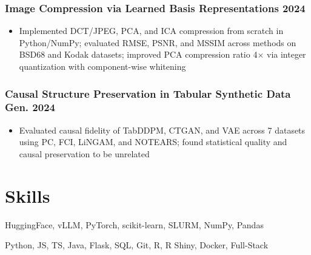 \documentclass[10pt]{article} %
\begin{document}
\subsubsection{Image Compression via Learned Basis Representations \hfill 2024}
\begin{itemize}
	\item Implemented DCT/JPEG, PCA, and ICA compression from scratch in Python/NumPy; evaluated RMSE, PSNR, and MSSIM across methods on BSD68 and Kodak datasets; improved PCA compression ratio 4$\times$ via integer quantization with component-wise whitening
\end{itemize}
\vspace{-7pt}
\subsubsection{Causal Structure Preservation in Tabular Synthetic Data Gen. \hfill 2024}
\begin{itemize}
	\item Evaluated causal fidelity of TabDDPM, CTGAN, and VAE across 7 datasets using PC, FCI, LiNGAM, and NOTEARS; found statistical quality and causal preservation to be unrelated
\end{itemize}

\section{Skills}
\begin{description}[itemsep=0pt]
	\item[ML/AI] HuggingFace, vLLM, PyTorch, scikit-learn, SLURM, NumPy, Pandas
	\item[Software] Python, JS, TS, Java, Flask, SQL, Git, R, R Shiny, Docker, Full-Stack
\end{description}
\end{document}
